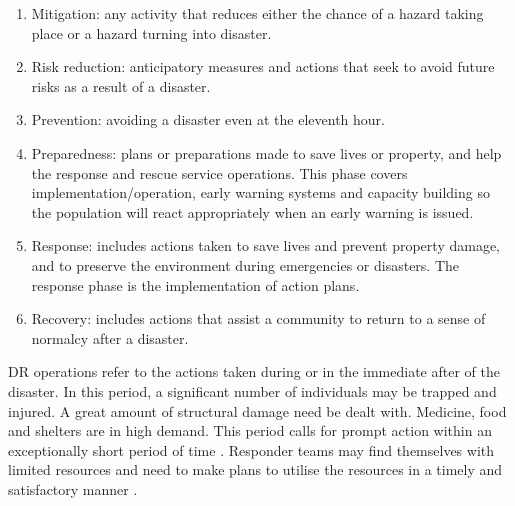 \begin{enumerate}
\item Mitigation: any activity that reduces either the chance of a hazard taking place or a hazard turning into disaster.
\item Risk reduction: anticipatory measures and actions that seek to avoid future risks as a result of a disaster.
\item Prevention: avoiding a disaster even at the eleventh hour. 
\item Preparedness: plans or preparations made to save lives or property, and help the response and rescue service operations. This phase covers implementation/operation, early warning systems and capacity building so the population will react appropriately when an early warning is issued.
\item Response: includes actions taken to save lives and prevent property damage, and to preserve the environment during emergencies or disasters. The response phase is the implementation of action plans.
\item Recovery: includes actions that assist a community to return to a sense of normalcy after a disaster.
\end{enumerate}

\ac{DR} operations refer to the actions taken during or in the immediate after of the disaster. In this period, a significant number of individuals may be trapped and injured. A great amount of structural damage need be dealt with. Medicine, food and shelters are in high demand. This period calls for prompt action within an exceptionally short period of time \citep{Wattegama2012}. Responder teams may find themselves with limited resources and need to make plans to utilise the resources in a timely and satisfactory manner \citep{Chen2005,Chen2008}. \\



